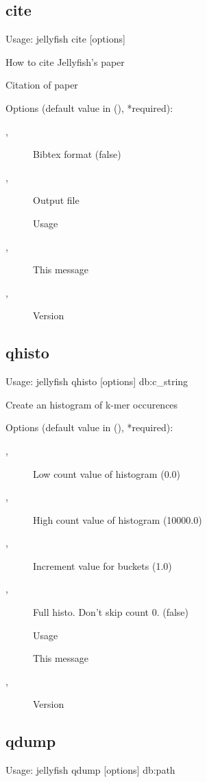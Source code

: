 \subsection{cite}
\noindent Usage: jellyfish cite [options]

\noindent How to cite Jellyfish's paper

\noindent Citation of paper

\noindent Options (default value in (), *required):
\begin{description}
\item[,] \noindent Bibtex format (false)
\item[,] \noindent Output file
\item[] \noindent Usage
\item[,] \noindent This message
\item[,] \noindent Version
\end{description}
\subsection{qhisto}
\noindent Usage: jellyfish qhisto [options] db:c\_string

\noindent Create an histogram of k-mer occurences

\noindent Options (default value in (), *required):
\begin{description}
\item[,] \noindent Low count value of histogram (0.0)
\item[,] \noindent High count value of histogram (10000.0)
\item[,] \noindent Increment value for buckets (1.0)
\item[,] \noindent Full histo. Don't skip count 0. (false)
\item[] \noindent Usage
\item[] \noindent This message
\item[,] \noindent Version
\end{description}
\subsection{qdump}
\noindent Usage: jellyfish qdump [options] db:path

